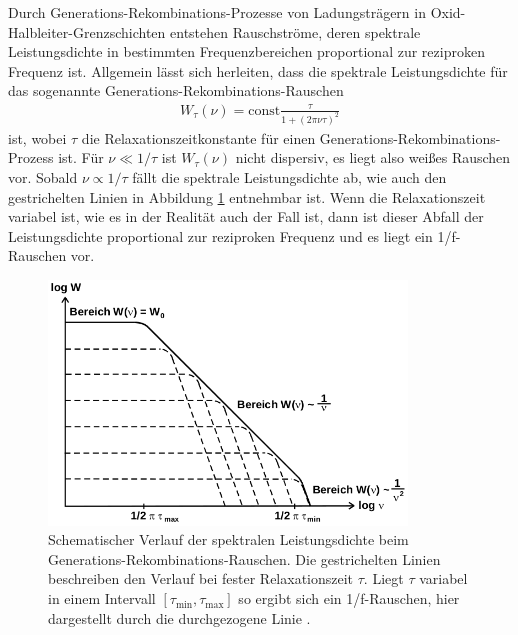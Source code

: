 Durch Generations-Rekombinations-Prozesse von Ladungsträgern in Oxid-Halbleiter-Grenzschichten entstehen
Rauschströme, deren spektrale Leistungsdichte in bestimmten Frequenzbereichen proportional zur reziproken Frequenz ist.
Allgemein lässt sich herleiten, dass die spektrale Leistungsdichte für das sogenannte Generations-Rekombinations-Rauschen
\begin{align}
  W_\tau(\nu) = \text{const} \frac{\tau}{1+(2 \pi \nu \tau)^2}
\end{align}
ist, wobei $\tau$ die Relaxationszeitkonstante für einen Generations-Rekombinations-Prozess ist.
Für $\nu \ll 1/\tau$ ist $W_\tau(\nu)$ nicht dispersiv, es liegt also weißes Rauschen vor.
Sobald $\nu \propto 1/\tau$ fällt die spektrale Leistungsdichte ab, wie auch den gestrichelten Linien
in Abbildung \ref{fig:leistungsdichte} entnehmbar ist. Wenn die Relaxationszeit variabel ist, wie es in der
Realität auch der Fall ist, dann ist dieser Abfall der Leistungsdichte proportional zur reziproken Frequenz
und es liegt ein 1/f-Rauschen vor.

\begin{figure}
  \centering
  \includegraphics[height=6.5cm]{Dickpics/leistungsdichte.png}
  \caption{Schematischer Verlauf der spektralen Leistungsdichte beim Generations-Rekombinations-Rauschen. Die gestrichelten Linien
  beschreiben den Verlauf bei fester Relaxationszeit $\tau$. Liegt $\tau$ variabel in einem Intervall $[\tau_\text{min}, \tau_\text{max}]$
  so ergibt sich ein 1/f-Rauschen, hier dargestellt durch die durchgezogene Linie \cite{anleitung}.}
  \label{fig:leistungsdichte}
\end{figure}

